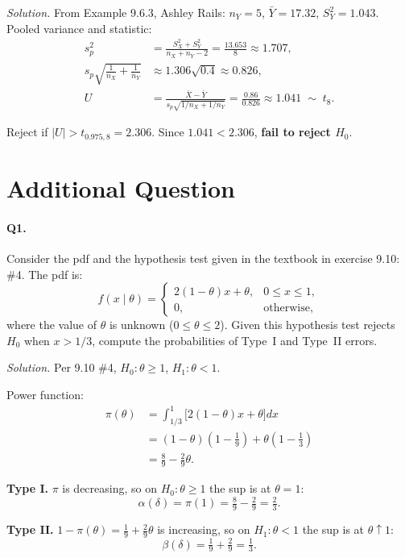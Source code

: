\documentclass[11pt]{article}
\begin{document}
\textit{Solution.} From Example 9.6.3, Ashley Rails: $n_Y = 5$, $\bar{Y} = 17.32$, $S_Y^2 = 1.043$.
Pooled variance and statistic:
\begin{align*}
    s_p^2 &= \tfrac{S_X^2 + S_Y^2}{n_X + n_Y - 2}
          = \tfrac{13.653}{8} \approx 1.707, \\
    s_p\sqrt{\tfrac{1}{n_X}+\tfrac{1}{n_Y}}
          &\approx 1.306\sqrt{0.4} \approx 0.826, \\
    U &= \tfrac{\bar{X}-\bar{Y}}{s_p\sqrt{1/n_X + 1/n_Y}}
       = \tfrac{0.86}{0.826} \approx 1.041 \;\sim\; t_8.
\end{align*}

Reject if $|U| > t_{0.975,8} = 2.306$. Since $1.041 < 2.306$, \textbf{fail to reject $H_0$}.

\newpage

\section*{Additional Question}

\paragraph{Q1.}
Consider the pdf and the hypothesis test given in the textbook in exercise 9.10: \#4.
The pdf is:
\[
    f(x \mid \theta) =
    \begin{cases}
        2(1-\theta)x + \theta, & 0 \leq x \leq 1, \\
        0, & \text{otherwise},
    \end{cases}
\]
where the value of $\theta$ is unknown ($0 \leq \theta \leq 2$). Given this
hypothesis test rejects $H_0$ when $x > 1/3$, compute the probabilities of Type~I
and Type~II errors.

\textit{Solution.} Per 9.10 \#4, $H_0\colon \theta \ge 1$, $H_1\colon \theta < 1$.

Power function:
\begin{align*}
    \pi(\theta) &= \int_{1/3}^{1}\!\bigl[2(1-\theta)x + \theta\bigr]dx \\
                &= (1-\theta)\!\left(1 - \tfrac{1}{9}\right) + \theta\!\left(1 - \tfrac{1}{3}\right) \\
                &= \tfrac{8}{9} - \tfrac{2}{9}\theta.
\end{align*}

\textbf{Type I.} $\pi$ is decreasing, so on $H_0\colon \theta \ge 1$ the sup is at $\theta = 1$:
\[
    \alpha(\delta) = \pi(1) = \tfrac{8}{9} - \tfrac{2}{9} = \tfrac{2}{3}.
\]

\textbf{Type II.} $1 - \pi(\theta) = \tfrac{1}{9} + \tfrac{2}{9}\theta$ is increasing, so on $H_1\colon \theta < 1$ the sup is at $\theta \uparrow 1$:
\[
    \beta(\delta) = \tfrac{1}{9} + \tfrac{2}{9} = \tfrac{1}{3}.
\]
\end{document}
